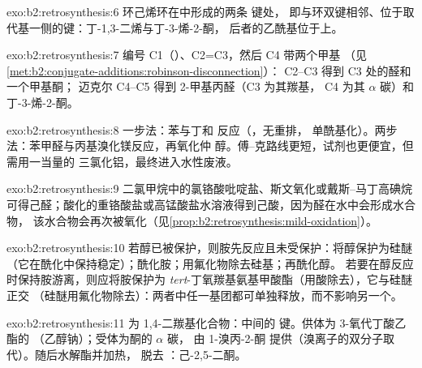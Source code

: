 \begin{solution}{exo:b2:retrosynthesis:6}
环己烯环在中形成的两条  键处，
即与环双键相邻、位于取代基一侧的键：丁-1,3-二烯与丁-3-烯-2-酮，
后者的乙酰基位于上。
\end{solution}

\begin{solution}{exo:b2:retrosynthesis:7}
编号 C1（）、C2=C3，然后 C4 带两个甲基
（见\cref{met:b2:conjugate-additions:robinson-disconnection}）： C2--C3 得到 C3 处的醛和一个甲基酮；
迈克尔 C4--C5 得到 2-甲基丙醛（C3 为其羰基，
C4 为其 $\alpha$ 碳）和丁-3-烯-2-酮。
\end{solution}

\begin{solution}{exo:b2:retrosynthesis:8}
一步法：苯与丁和  反应（，无重排，
单酰基化）。两步法：苯甲醛与丙基溴化镁反应，再氧化仲
醇。傅–克路线更短，试剂也更便宜，但需用一当量的
三氯化铝，最终进入水性废液。
\end{solution}

\begin{solution}{exo:b2:retrosynthesis:9}
二氯甲烷中的氯铬酸吡啶盐、斯文氧化或戴斯–马丁高碘烷
可得己醛；酸化的重铬酸盐或高锰酸盐水溶液得到己酸，因为醛在水中会形成水合物，
该水合物会再次被氧化（见\cref{prop:b2:retrosynthesis:mild-oxidation}）。
\end{solution}

\begin{solution}{exo:b2:retrosynthesis:10}
若醇已被保护，则胺先反应且未受保护：将醇保护为硅醚
（它在酰化中保持稳定）；酰化胺；用氟化物除去硅基；再酰化醇。
若要在醇反应时保持胺游离，则应将胺保护为
\textit{tert}-丁氧羰基氨基甲酸酯（用酸除去），它与硅醚正交
（硅醚用氟化物除去）：两者中任一基团都可单独释放，而不影响另一个。
\end{solution}

\begin{solution}{exo:b2:retrosynthesis:11}
 为 1,4-二羰基化合物：中间的  键。供体为 3-氧代丁酸乙酯的
（乙醇钠）；受体为酮的 $\alpha$ 碳，
由 1-溴丙-2-酮  提供（溴离子的双分子取代）。随后水解酯并加热，
脱去 ：己-2,5-二酮。
\end{solution}

